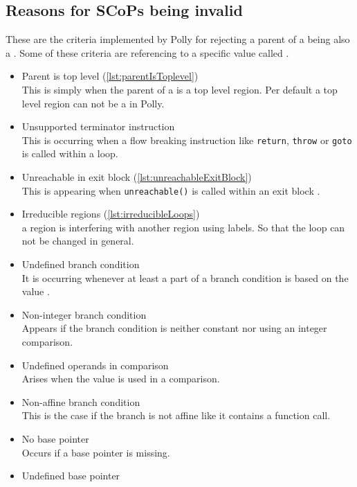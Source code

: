 \subsection{Reasons for SCoPs being invalid}
These are the criteria implemented by Polly for rejecting a parent of a \scop being also a \scop.
Some of these criteria are referencing to a \llvm specific value called \undefv \cite{llvmUndef}.
\begin{itemize}
    \item Parent is top level (\autoref{lst:parentIsToplevel})\\
        This is simply when the parent of a \scop is a top level region.
        Per default a top level region can not be a \scop in Polly.
    \item Unsupported terminator instruction\\
        This is occurring when a flow breaking instruction like \texttt{return}, \texttt{throw} or \texttt{goto} is called within a loop.
    \item Unreachable in exit block (\autoref{lst:unreachableExitBlock})\\
        This is appearing when \texttt{unreachable()} is called within an exit block \cite{llvmUnreachable}.
    \item Irreducible regions (\autoref{lst:irreducibleLoops})\\
        \Eg a region is interfering with another region using labels.
        So that the loop can not be changed in general.
    \item Undefined branch condition\\
        It is occurring whenever at least a part of a branch condition is based on the value \undefv.
    \item Non-integer branch condition\\
        Appears if the branch condition is neither constant nor using an integer comparison.
    \item Undefined operands in comparison\\
        Arises when the value \undefv is used in a comparison.
    \item Non-affine branch condition\\
        This is the case if the branch is not affine like it contains a function call.
    \item No base pointer\\
        Occurs if a base pointer is missing.
    \item Undefined base pointer\\

\end{itemize}
